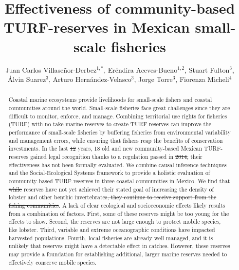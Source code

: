 \documentclass{frontiersSCNS}
\def\firstAuthorLast{Villaseñor-Derbez {et~al.}}
\def\Authors{Juan Carlos Villaseñor-Derbez\(^{1,*}\), Eréndira Aceves-Bueno\(^{1,2}\), Stuart Fulton\(^{3}\), Álvin Suarez\(^{3}\), Arturo Hernández-Velasco\(^{3}\), Jorge Torre\(^{3}\), Fiorenza Micheli\(^{4}\)} %
\providecommand{\DIFaddtex}[1]{{\protect\color{blue}\uwave{#1}}} %
\providecommand{\DIFdeltex}[1]{{\protect\color{red}\sout{#1}}}                      %
\providecommand{\DIFaddbegin}{} %
\providecommand{\DIFaddend}{} %
\providecommand{\DIFdelbegin}{} %
\providecommand{\DIFdelend}{} %
\providecommand{\DIFadd}[1]{\texorpdfstring{\DIFaddtex{#1}}{#1}} %
\providecommand{\DIFdel}[1]{\texorpdfstring{\DIFdeltex{#1}}{}} %
\begin{document}
\onecolumn
{}

\title[Community-based TURF-reserves]{Effectiveness of community-based TURF-reserves in Mexican small-scale fisheries} 

\author[\firstAuthorLast ]{\Authors} %
\address{} %
\correspondance{} %

\extraAuth{}

\maketitle



\begin{abstract}

Coastal marine ecosystems provide livelihoods for small-scale fishers and coastal communities around the world. Small-scale fisheries face great challenges since they are difficult to monitor, enforce, and manage. Combining territorial use rights for fisheries (TURF) with no-take marine reserves to create TURF-reserves can improve the performance of small-scale fisheries by buffering fisheries from environmental variability and management errors, while ensuring that fishers reap the benefits of conservation investments. In the last \DIFdelbegin \DIFdel{12
}\DIFdelend \DIFaddbegin \DIFadd{13 }\DIFaddend years, 18 old and new community-based Mexican TURF-reserves gained legal recognition thanks to a regulation passed in \DIFdelbegin \DIFdel{2014}\DIFdelend \DIFaddbegin \DIFadd{2012}\DIFaddend ; their effectiveness has not been formally evaluated. We combine causal inference techniques and the Social-Ecological Systems framework to provide a holistic evaluation of community-based TURF-reserves in three coastal communities in Mexico. We find that \DIFdelbegin \DIFdel{while }\DIFdelend reserves have not yet achieved their stated goal of increasing the density of lobster and other benthic invertebrates\DIFdelbegin \DIFdel{, they continue to receive support from the fishing
communities}\DIFdelend . A lack of clear ecological and socioeconomic effects likely results from a combination of factors. First, some of these reserves might be too young for the effects to show. Second, the reserves are not large enough to protect mobile species, like lobster. Third, variable and extreme oceanographic conditions have impacted harvested populations. Fourth, local fisheries are already well managed, and it is unlikely that reserves might have a detectable effect in catches. However, these reserves may provide a foundation for establishing additional, larger marine reserves needed to effectively conserve mobile species.





\end{abstract}
\end{document}

